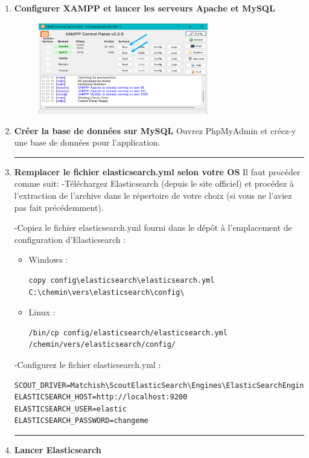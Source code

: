 \begin{enumerate}
    \item \textbf{Configurer XAMPP et lancer les serveurs Apache et MySQL}
        \begin{figure}[h!] 
            \centering 
            \includegraphics[width=0.7\textwidth]{./img/xampp.png} 
        \end{figure}
    \item \textbf{Créer la base de données sur MySQL}
Ouvrez PhpMyAdmin et créez-y une base de données pour l'application.
    
\rule{\linewidth}{0.2pt}
    \item \textbf{Remplacer le fichier elasticsearch.yml selon votre OS} 
Il faut procéder comme suit:
-Téléchargez Elasticsearch (depuis le site officiel) et procédez à l'extraction de l'archive dans le répertoire de votre choix (si vous ne l'aviez pas fait précédemment).

-Copiez le fichier elasticsearch.yml fourni dans le dépôt à l'emplacement de configuration d'Elasticsearch : 
        \begin{itemize}
            \item Windows :
            \begin{lstlisting}
copy config\elasticsearch\elasticsearch.yml C:\chemin\vers\elasticsearch\config\
            \end{lstlisting}
            \item Linux :
            \begin{lstlisting}
/bin/cp config/elasticsearch/elasticsearch.yml /chemin/vers/elasticsearch/config/
            \end{lstlisting}
        \end{itemize}
-Configurez le fichier elasticsearch.yml :
    \begin{lstlisting}
SCOUT_DRIVER=Matchish\ScoutElasticSearch\Engines\ElasticSearchEngine
ELASTICSEARCH_HOST=http://localhost:9200
ELASTICSEARCH_USER=elastic
ELASTICSEARCH_PASSWORD=changeme
    \end{lstlisting}
\rule{\linewidth}{0.2pt}
    \item \textbf{Lancer Elasticsearch}


\end{enumerate}
